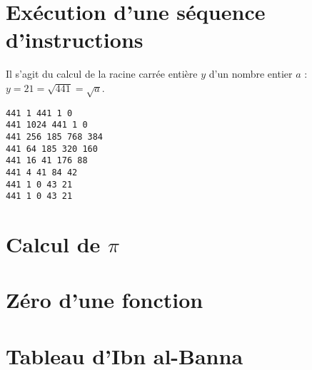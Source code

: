 \documentclass[11pt,a4paper]{article}
\begin{document}

\section{Exécution d'une séquence d'instructions}
%

\noindent\begin{minipage}{8cm}
Il s'agit du calcul de la racine carrée entière $y$ d'un nombre entier $a$ :
$y = 21 = \sqrt{441} = \sqrt{a}$.
\end{minipage}
\hfill
\begin{py}{7cm}
\begin{verbatim}
441 1 441 1 0
441 1024 441 1 0
441 256 185 768 384
441 64 185 320 160
441 16 41 176 88
441 4 41 84 42
441 1 0 43 21
441 1 0 43 21
\end{verbatim}
\end{py}

\section{Calcul de $\pi$}



\section{Zéro d'une fonction}



\section{Tableau d'Ibn al-Banna}


\label{fini}
\end{document}
